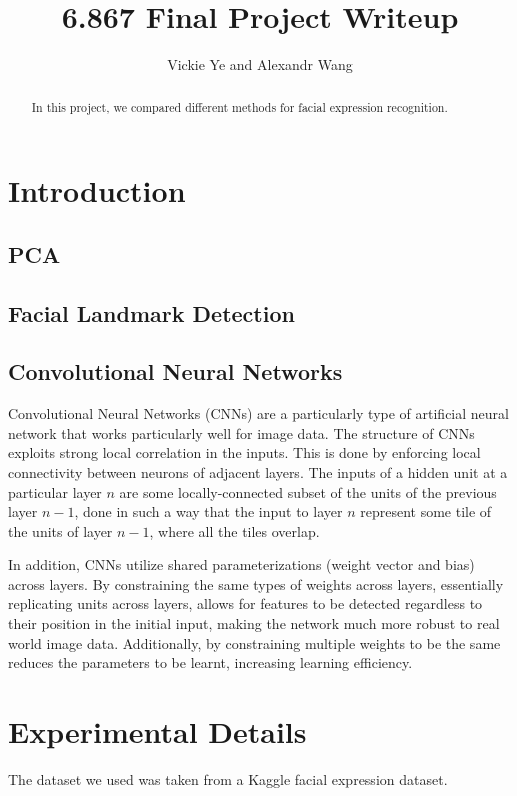 \documentclass[11pt, twocolumn, twoside]{article}
\title{6.867 Final Project Writeup} %
\date{}
\author {Vickie Ye and Alexandr Wang}
\begin{document}
\maketitle


\begin{abstract}
In this project, we compared different methods for facial expression recognition.
\end{abstract}

\section{Introduction}

\subsection{PCA}

\subsection{Facial Landmark Detection}

\subsection{Convolutional Neural Networks}

Convolutional Neural Networks (CNNs) are a particularly type of artificial neural network that works particularly well for image data. The structure of CNNs exploits strong local correlation in the inputs. This is done by enforcing local connectivity between neurons of adjacent layers. The inputs of a hidden unit at a particular layer $n$ are some locally-connected subset of the units of the previous layer $n-1$, done in such a way that the input to layer $n$ represent some tile of the units of layer $n-1$, where all the tiles overlap.

In addition, CNNs utilize shared parameterizations (weight vector and bias) across layers. By constraining the same types of weights across layers, essentially replicating units across layers, allows for features to be detected regardless to their position in the initial input, making the network much more robust to real world image data. Additionally, by constraining multiple weights to be the same reduces the parameters to be learnt, increasing learning efficiency.

\section{Experimental Details}
The dataset we used was taken from a Kaggle facial expression dataset.
\end{document}
